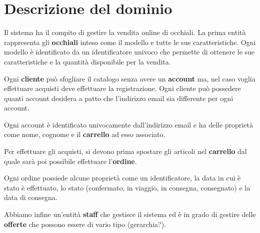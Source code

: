 \section{Descrizione del dominio}
Il sistema ha il compito di gestire la vendita online di occhiali. La prima entità rappresenta
gli \textbf{occhiali} inteso come il modello e tutte le sue caratteristiche. Ogni modello è
identificato da un identificatore univoco che permette di ottenere le sue caratteristiche e la
quantità disponibile per la vendita.

Ogni \textbf{cliente} può sfogliare il catalogo senza avere un \textbf{account} ma, nel caso
voglia effettuare acquisti deve effettuare la registrazione. Ogni cliente può possedere quanti
account desidera a patto che l'indirizzo email sia differente per ogni account.

Ogni account è identificato univocamente dall'indirizzo email e ha delle proprietà come nome,
cognome e il \textbf{carrello} ad esso associato.

Per effettuare gli acquisti, si devono prima spostare gli articoli nel \textbf{carrello} dal quale
sarà poi possibile effettuare l'\textbf{ordine}.

Ogni ordine possiede alcune proprietà come un identificatore, la data in cui è stato è effettuato,
lo stato (confermato, in viaggio, in consegna, consegnato) e la data di consegna.

Abbiamo infine un'entità \textbf{staff} che gestisce il sistema ed è in grado di gestire delle
\textbf{offerte} che possono essere di vario tipo (gerarchia?).

